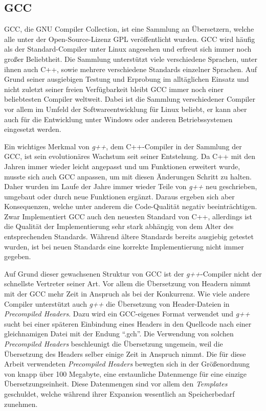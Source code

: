 \subsection{GCC}
GCC, die GNU Compiler Collection, ist eine Sammlung an Übersetzern, welche alle unter der Open-Source-Lizenz GPL veröffentlicht wurden. GCC wird häufig als der Standard-Compiler unter Linux angesehen
und erfreut sich immer noch großer Beliebtheit. Die Sammlung unterstützt viele verschiedene Sprachen, unter ihnen auch C++, sowie mehrere verschiedene Standards einzelner Sprachen. Auf Grund seiner
ausgiebigen Testung und Erprobung im all\-täg\-lich\-en Einsatz und nicht zuletzt seiner freien Verfügbarkeit bleibt GCC immer noch einer beliebtesten Compiler weltweit. Dabei ist die Sammlung verschiedener
Compiler vor allem im Umfeld der Softwareentwicklung für Linux beliebt, er kann aber auch für die Entwicklung unter Windows oder anderen Betriebssystemen eingesetzt werden.

Ein wichtiges Merkmal von \textit{g++}, dem C++-Compiler in der Sammlung der GCC, ist sein evolutionäres Wachstum seit seiner Entstehung. Da C++ mit den Jahren immer wieder lei\-cht angepasst und um Funktionen
erweitert wurde, musste sich auch GCC anpassen, um mit diesen Änderungen Schritt zu halten. Daher wurden im Laufe der Jahre immer wieder Teile von \textit{g++} neu geschrieben, umgebaut oder durch
neue Funktionen ergänzt. Daraus ergeben sich aber Konsequenzen, welche unter anderem die Code-Qualität negativ beeinträchtigen. Zwar Implementiert GCC auch den neuesten Standard von C++, allerdings
ist die Qualität der Implementierung sehr stark abhängig von dem Alter des entsprechenden Standards. Während ältere Standards bereits ausgiebig getestet wurden, ist bei neuen Standards eine korrekte 
Implementierung nicht immer gegeben. 

Auf Grund dieser gewachsenen Struktur von GCC ist der \textit{g++}-Compiler nicht der schnellste Vertreter seiner Art. Vor allem die Übersetzung von Headern nimmt mit der GCC mehr Zeit in Anspruch als
bei der Konkurrenz. Wie viele andere Compiler unterstützt auch \textit{g++} die Übersetzung von Header-Dateien in \textit{Precompiled Headers}. Dazu wird ein GCC-eigenes Format verwendet und \textit{g++} sucht bei einer
späteren Einbindung eines Headers in den Quellcode nach einer gleichnamigen Datei mit der Endung ``.gch''. Die Verwendung von solchen \textit{Precompiled Headers} beschleunigt die Übersetzung ungemein, 
weil die Übersetzung des Headers selber einige Zeit in Anspruch nimmt. Die für diese Arbeit verwendeten \textit{Precompiled Headers} bewegten sich in der Größenordnung von knapp über 100 Megabyte, 
eine erstaunliche Datenmenge für eine einzige Übersetzungseinheit. Diese Datenmengen sind vor allem den \textit{Templates} geschuldet, welche während ihrer Expansion wesentlich an Speicherbedarf zunehmen.

